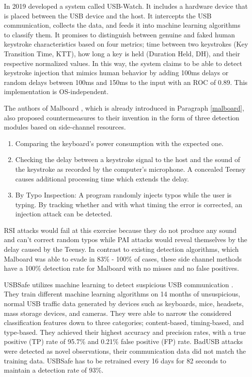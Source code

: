 In 2019 \cite{denneyUSBWatchDynamicHardwareAssisted2019} developed a system called USB-Watch. It includes a hardware device that is placed between the USB device and the host. It intercepts the USB communication, collects the data, and feeds it into machine learning algorithms to classify them. It promises to distinguish between genuine and faked human keystroke characteristics based on four metrics; time between two keystrokes (Key Transition Time, KTT), how long a key is held (Duration Held, DH), and their respective normalized values. In this way, the system claims to be able to detect keystroke injection that mimics human behavior by adding 100ms delays or random delays between 100ms and 150ms to the input with an ROC of 0.89. This implementation is OS-independent.

The authors of Malboard \cite{farhiMalboardNovelUser2019}, which is already introduced in Paragraph \ref{malboard}, also proposed countermeasures to their invention in the form of three detection modules based on side-channel resources. 
\begin{enumerate}
    \item Comparing the keyboard's power consumption with the expected one.
    \item Checking the delay between a keystroke signal to the host and the sound of the keystroke as recorded by the computer's microphone. A concealed Teensy causes additional processing time which extends the delay.
    \item By Typo Inspection: A program randomly injects typos while the user is typing. By tracking whether and with what timing the error is corrected, an injection attack can be detected.
\end{enumerate}
RSI attacks would fail at this exercise because they do not produce any sound and can't correct random typos while PAI attacks would reveal themselves by the delay caused by the Teensy.   
In contrast to existing detection algorithms, which Malboard was able to evade in 83\% - 100\% of cases, these side channel methods have a 100\%  detection rate for Malboard with no misses and no false positives.  

USBSafe utilizes machine learning to detect suspicious USB communication \cite{kharrazUSBESAFEEndPointSolution2019}. They train different machine learning algorithms on 14 months of unsuspicious, normal USB traffic data generated by devices such as keyboards, mice, headsets, mass storage devices, and cameras. They were able to narrow the considered classification features down to three categories; content-based, timing-based, and type-based. They achieved their highest accuracy and precision rates, with a true positive (TP) rate of 95.7\% and 0.21\% false positive (FP) rate. BadUSB attacks were detected as novel observations, their communication data did not match the training data.
USBSafe has to be retrained every 16 days for 82 seconds to maintain a detection rate of 93\%.

